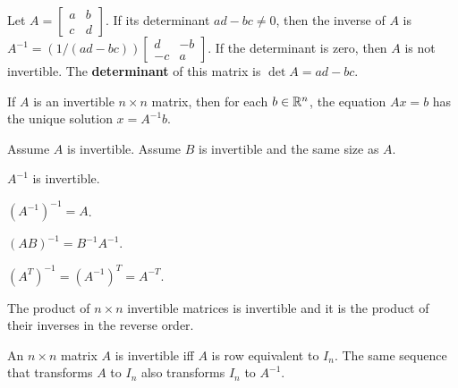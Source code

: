 \begin{card}
    \begin{theorem}[Inverse of 2 by 2]
    Let  $A = \begin{bmatrix}a & b \\ c & d\end{bmatrix}$.
    If its determinant $ad - bc \neq 0$, then the inverse of $A$ is
    $A^{-1} = (1/(ad - bc))\begin{bmatrix}d & -b \\ -c & a\end{bmatrix}$.
    If the determinant is zero, then $A$ is not invertible.
    The \textbf{determinant} of this matrix is $\det A = ad - bc$.
    \end{theorem}

    \begin{theorem}\label{th-inv-soln}
        If $A$ is an invertible $n \times n$ matrix, then for each $b \in \mathbb{R}^n$,
        the equation $Ax = b$ has the unique solution $x = A^{-1}b$.
    \end{theorem}

    \begin{theorem}
    Assume $A$ is invertible.
    Assume $B$ is invertible and the same size as $A$.
    \begin{compactenum}
    \item $A^{-1}$ is invertible.
    \item $(A^{-1})^{-1} = A$.
    \item $(AB)^{-1} = B^{-1}A^{-1}$.
    \item $(A^T)^{-1} = (A^{-1})^T = A^{-T}$.
    \item The product of $n \times n$ invertible matrices is invertible and
        it is the product of their inverses in the reverse order.
    \end{compactenum}
    \end{theorem}

    \begin{theorem}\label{th-gen-inverse}
        An $n\times n$ matrix $A$ is invertible iff $A$ is row equivalent to
        $I_n$. The same sequence that transforms $A$ to $I_n$ also transforms
        $I_n$ to $A^{-1}$.
    \end{theorem}
\end{card}


